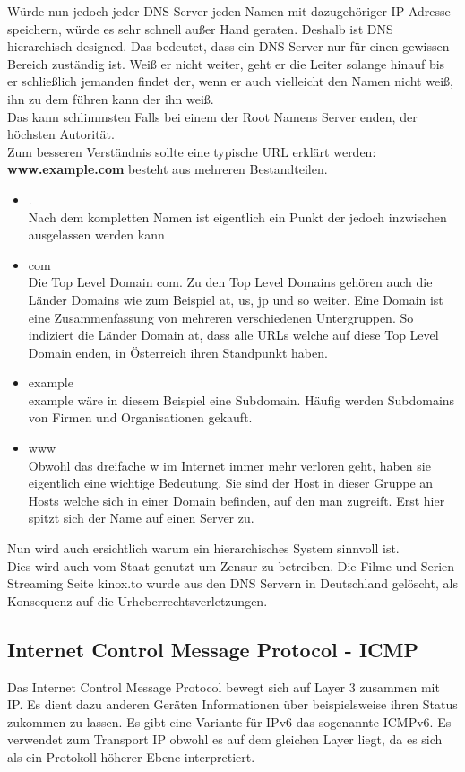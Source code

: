 \documentclass[11pt,a4paper]{report}
\begin{document}
Würde nun jedoch jeder DNS Server jeden Namen mit dazugehöriger IP-Adresse speichern, würde es sehr schnell außer Hand geraten. Deshalb ist DNS hierarchisch designed. Das bedeutet, dass ein DNS-Server nur für einen gewissen Bereich zuständig ist. Weiß er nicht weiter, geht er die Leiter solange hinauf bis er schließlich jemanden findet der, wenn er auch vielleicht den Namen nicht weiß, ihn zu dem führen kann der ihn weiß.\\
Das kann schlimmsten Falls bei einem der Root Namens Server enden, der höchsten Autorität.\\

Zum besseren Verständnis sollte eine typische URL erklärt werden:\\
\textbf{www.example.com} besteht aus mehreren Bestandteilen.
\begin{itemize}
\item .\\
Nach dem kompletten Namen ist eigentlich ein Punkt der jedoch inzwischen ausgelassen werden kann
\item com\\
Die Top Level Domain \glqq com\grqq . Zu den Top Level Domains gehören auch die Länder Domains wie zum Beispiel at, us, jp und so weiter. Eine Domain ist eine Zusammenfassung von mehreren verschiedenen Untergruppen. So indiziert die Länder Domain at, dass alle URLs welche auf diese Top Level Domain enden, in Österreich ihren Standpunkt haben.
\item example\\
example wäre in diesem Beispiel eine Subdomain. Häufig werden Subdomains von Firmen und Organisationen gekauft. 
\item www\\
Obwohl das dreifache w im Internet immer mehr verloren geht, haben sie eigentlich eine wichtige Bedeutung. Sie sind der Host in dieser Gruppe an Hosts welche sich in einer Domain befinden, auf den man zugreift. Erst hier spitzt sich der Name auf einen Server zu. 
\end{itemize}
Nun wird auch ersichtlich warum ein hierarchisches System sinnvoll ist.\\

Dies wird auch vom Staat genutzt um Zensur zu betreiben. Die Filme und Serien Streaming Seite kinox.to wurde aus den DNS Servern in Deutschland gelöscht, als Konsequenz auf die Urheberrechtsverletzungen.
\subsection{Internet Control Message Protocol - ICMP}
Das Internet Control Message Protocol bewegt sich auf Layer 3 zusammen mit IP. Es dient dazu anderen Geräten Informationen über beispielsweise ihren Status zukommen zu lassen. Es gibt eine Variante für IPv6 das sogenannte ICMPv6. Es verwendet zum Transport IP obwohl es auf dem gleichen Layer liegt, da es sich als ein Protokoll höherer Ebene interpretiert.\\
\end{document}

